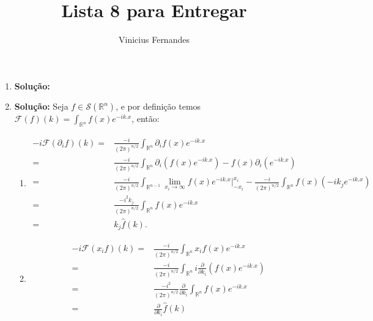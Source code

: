 \documentclass{article}
\begin{document}
	
	\title{Lista 8 para Entregar}
	\author{Vinicius Fernandes}
	
	\maketitle
	
	\begin{enumerate}
		
		
		\item \textbf{Solução:}
		
		\item \textbf{Solução:} Seja $f \in \mathcal{S}(\mathbb{R}^{n})$, e por definição temos $\mathcal{F}(f)(k) = \int_{\mathbb{R}^{n}} f(x)e^{-ik.x}$, então:
			\begin{enumerate}
				\item 
				$$
				\begin{aligned}
				-i\mathcal{F}(\partial_{i}f)(k) = & \frac{-i}{(2\pi)^{n/2}}\int_{\mathbb{R}^{n}} \partial_{i}f(x)e^{-ik.x}
				\\
				= & \frac{-i}{(2\pi)^{n/2}}\int_{\mathbb{R}^{n}} \partial_{i}( f(x)e^{-ik.x} ) - f(x)\partial_{i}(e^{-ik.x})
				\\
				= & \frac{-i}{(2\pi)^{n/2}}\int_{\mathbb{R}^{n-1}} \lim_{x_{i} \to \infty} f(x)e^{-ik.x} \Big|^{x_{i}}_{-x_{i}} - \frac{-i}{(2\pi)^{n/2}}\int_{\mathbb{R}^{n}}  f(x) (-ik_{j}e^{-ik.x})
				\\
				= & \frac{-i^{2}k_{j}}{(2\pi)^{n/2}}\int_{\mathbb{R}^{n}}  f(x) e^{-ik.x}
				\\
				= & k_{j}\hat{f}(k).	
				\end{aligned}
				$$
				
				\item
				$$
				\begin{aligned}
				-i\mathcal{F}(x_{i}f)(k) = & \frac{-i}{(2\pi)^{n/2}}\int_{\mathbb{R}^{n}} x_{i}f(x)e^{-ik.x}
				\\
				= & \frac{-i}{(2\pi)^{n/2}}\int_{\mathbb{R}^{n}} i\frac{\partial}{\partial k_{i}}( f(x)e^{-ik.x} )
				\\
				= & \frac{-i^{2}}{(2\pi)^{n/2}} \frac{\partial}{\partial k_{i}}\int_{\mathbb{R}^{n}} f(x)e^{-ik.x}
				\\
				= & \frac{\partial}{\partial k_{i}}\hat{f}(k)
				\end{aligned}
				$$
			\end{enumerate}
		

\end{enumerate}
\end{document}

